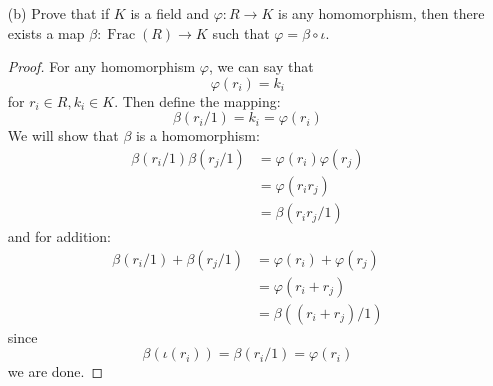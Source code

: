 \documentclass{article}
\begin{document}
\begin{itemize}
        \item [(b)] Prove that if $K$ is a field and $\varphi: R \rightarrow K$ is any homomorphism, then there exists a map $\beta: \mathop{Frac}(R) \rightarrow K$ such that $\varphi  = \beta \circ \iota$. 
            \begin{proof}
                For any homomorphism $\varphi$, we can say that
                    \begin{equation*}
                        \varphi(r_{i}) = k_{i}
                    \end{equation*}
                for $r_{i} \in R, k_{i} \in K$. Then define the mapping:
                    \begin{equation*}
                        \beta(r_{i}/1) = k_{i} = \varphi(r_{i})
                    \end{equation*}
                We will show that $\beta$ is a homomorphism:
                    \begin{align*}
                        \beta(r_{i}/1)\beta(r_{j}/1) &= \varphi(r_{i})\varphi(r_{j}) \\
                                                     &= \varphi(r_{i}r_{j})          \\
                                                     &= \beta(r_{i}r_{j}/1)            
                    \end{align*}
                and for addition:
                    \begin{align*}
                        \beta(r_{i}/1) + \beta(r_{j}/1) &= \varphi(r_{i}) + \varphi(r_{j}) \\
                                                        &= \varphi(r_{i} + r_{j})          \\
                                                        &= \beta((r_{i} + r_{j})/1)          
                    \end{align*}
                since 
                    \begin{equation*}
                        \beta(\iota(r_{i})) = \beta(r_{i}/1) = \varphi(r_{i})
                    \end{equation*}
                we are done.
            \end{proof}
    \end{itemize}
\end{document}
